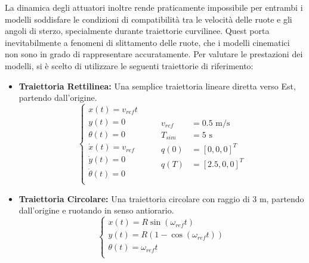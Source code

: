 La dinamica degli attuatori inoltre rende praticamente impossibile per entrambi i modelli soddisfare le condizioni di compatibilità tra le velocità delle ruote e gli angoli di sterzo, specialmente durante traiettorie curvilinee. Quest porta inevitabilmente a fenomeni di slittamento delle ruote, che i modelli cinematici non sono in grado di rappresentare accuratamente.
Per valutare le prestazioni dei modelli, si è scelto di utilizzare le seguenti traiettorie di riferimento:
\begin{itemize}
    \item \textbf{Traiettoria Rettilinea:} Una semplice traiettoria lineare diretta verso Est, partendo dall'origine.
          \begin{equation}
              \label{eq:straight_trajectory}
              \begin{cases}
                  x(t) = v_{ref} t     \\
                  y(t) = 0             \\
                  \theta(t) = 0        \\
                  \dot{x}(t) = v_{ref} \\
                  \dot{y}(t) = 0       \\
                  \dot{\theta}(t) = 0  \\
              \end{cases}\qquad
              \begin{aligned}
                  v_{ref} & = 0.5 \text{ m/s} \\
                  T_{sim} & = 5 \text{ s}     \\
                  q(0)    & = [0, 0, 0]^T     \\
                  q(T)    & = [2.5, 0, 0]^T
              \end{aligned}
          \end{equation}
    \item \textbf{Traiettoria Circolare:} Una traiettoria circolare con raggio di 3 m, partendo dall'origine e ruotando in senso antiorario.
          \begin{equation}
              \label{eq:circular_trajectory}
              \begin{cases}
                  x(t) = R \sin(\omega_{ref} t)             \\
                  y(t) = R (1 - \cos(\omega_{ref} t))       \\
                  \theta(t) = \omega_{ref} t                \\

\end{cases}
\end{equation}
\end{itemize}
